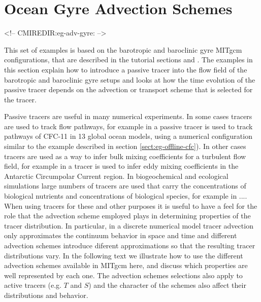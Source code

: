 


\section[Gyre Advection Example]{Ocean Gyre Advection Schemes}
\label{sect:eg-adv-gyre}
\label{www:tutorials}
\begin{rawhtml}
<!-- CMIREDIR:eg-adv-gyre: -->
\end{rawhtml}

This set of examples is based on the barotropic and baroclinic gyre MITgcm configurations,
that are described in the tutorial sections \label{sect:eg-baro} and \label{sect:eg-fourlayer}. 
The examples in this section explain how to introduce a passive tracer into the flow 
field of the barotropic and baroclinic gyre setups and looks at how the time evolution
of the passive tracer depends on the advection or transport scheme that is selected 
for the tracer. 

Passive tracers are useful in many numerical experiments. In some cases tracers are
used to track flow pathways, for example in \cite{Dutay02} a passive tracer is used
to track pathways of CFC-11 in 13 global ocean models, using a numerical
configuration similar to the example described in section \ref{sect:eg-offline-cfc}).
In other cases tracers are used as a way
to infer bulk mixing coefficients for a turbulent flow field, for example in 
\cite{marsh06} a tracer is used to infer eddy mixing coefficients in the
Antarctic Circumpolar Current region. In biogeochemical and ecological simulations large numbers 
of tracers are used that carry the concentrations of biological nutrients and concentrations of 
biological species, for example in ....
When using tracers for these and other purposes it is useful to have a feel for the role
that the advection scheme employed plays in determining properties of the tracer distribution.
In particular, in a discrete numerical model tracer advection only approximates the 
continuum behavior in space and time and different advection schemes introduce diferent 
approximations so that the resulting tracer distributions vary. In the following 
text we illustrate how
to use the different advection schemes available in MITgcm here, and discuss which properties 
are well represented by each one. The advection schemes selections also apply to active
tracers (e.g. $T$ and $S$) and the character of the schemes also affect their distributions
and behavior.

